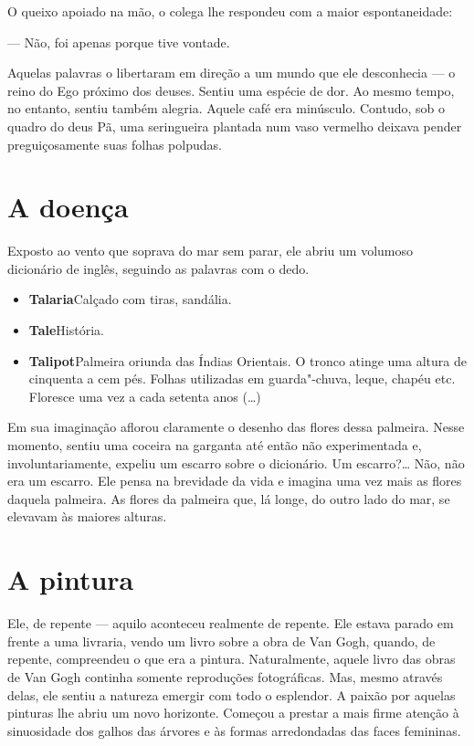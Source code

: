 O queixo apoiado na mão, o colega lhe respondeu com a maior
espontaneidade:

--- Não, foi apenas porque tive vontade.

Aquelas palavras o libertaram em direção a um mundo que ele desconhecia
--- o reino do Ego próximo dos deuses. Sentiu uma espécie de dor. Ao
mesmo tempo, no entanto, sentiu também alegria. Aquele café era
minúsculo. Contudo, sob o quadro do deus Pã, uma seringueira plantada
num vaso vermelho deixava pender preguiçosamente suas folhas polpudas.

\section{A doença}

Exposto ao vento que soprava do mar sem parar, ele abriu um volumoso
dicionário de inglês, seguindo as palavras com o dedo.

\begin{itemize}
\item \textbf{Talaria}\quad Calçado com tiras, sandália.

\item \textbf{Tale}\quad História.

\item \textbf{Talipot}\quad Palmeira oriunda das Índias Orientais. O tronco atinge uma altura de cinquenta a cem pés. Folhas utilizadas em guarda"-chuva, leque, 
chapéu etc. Floresce uma vez a cada setenta anos (\ldots{})
\end{itemize}

Em sua imaginação aflorou claramente o desenho das flores dessa
palmeira. Nesse momento, sentiu uma coceira na garganta até então não
experimentada e, involuntariamente, expeliu um escarro sobre o
dicionário. Um escarro?\ldots{} Não, não era um escarro. Ele pensa na
brevidade da vida e imagina uma vez mais as flores daquela palmeira. As
flores da palmeira que, lá longe, do outro lado do mar, se elevavam às
maiores alturas.

\section{A pintura}

Ele, de repente --- aquilo aconteceu realmente de repente. Ele estava
parado em frente a uma livraria, vendo um livro sobre a obra de Van
Gogh, quando, de repente, compreendeu o que era a pintura.
Naturalmente, aquele livro das obras de Van Gogh continha somente
reproduções fotográficas. Mas, mesmo através delas, ele sentiu a
natureza emergir com todo o esplendor. A paixão por aquelas pinturas
lhe abriu um novo horizonte. Começou a prestar a mais firme atenção à
sinuosidade dos galhos das árvores e às formas arredondadas das faces
femininas.

